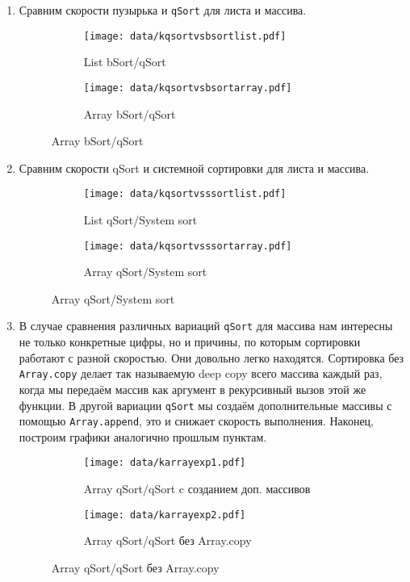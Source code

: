 \begin{enumerate}
\begin{figure}[H]
\begin{subfigure}[b]{0.40\textwidth}
	\end{subfigure}
	\end{figure}
  \item Сравним скорости пузырька и \verb|qSort| для листа и массива.
  	\begin{figure}[H]
	\centering
	\begin{subfigure}[b]{0.40\textwidth}
       \centering
	   \texttt{[image: data/kqsortvsbsortlist.pdf]}
	   \caption{List bSort/qSort}
	\end{subfigure}
	\begin{subfigure}[b]{0.40\textwidth}
       \centering
	   \texttt{[image: data/kqsortvsbsortarray.pdf]}
	   \caption{Array bSort/qSort}
	\end{subfigure}
	\end{figure}
  \item Сравним скорости qSort и системной сортировки для листа и массива.
  	\begin{figure}[H]
	\centering
	\begin{subfigure}[b]{0.40\textwidth}
       \centering
	   \texttt{[image: data/kqsortvsssortlist.pdf]}
	   \caption{List qSort/System sort}
	\end{subfigure}
	\begin{subfigure}[b]{0.40\textwidth}
       \centering
	   \texttt{[image: data/kqsortvsssortarray.pdf]}
	   \caption{Array qSort/System sort}
	\end{subfigure}
	\end{figure}
  \item В случае сравнения различных вариаций \verb|qSort| для массива нам интересны не только конкретные цифры, но и причины, по которым сортировки работают с разной скоростью. Они довольно легко находятся. Сортировка без \verb|Array.copy| делает так называемую deep copy всего массива каждый раз, когда мы передаём массив как аргумент в рекурсивный вызов этой же функции. В другой вариации \verb|qSort| мы создаём дополнительные массивы с помощью \verb|Array.append|, это и снижает скорость выполнения. Наконец, построим графики аналогично прошлым пунктам.
  	\begin{figure}[H]
	\centering
	\begin{subfigure}[b]{0.40\textwidth}
       \centering
	   \texttt{[image: data/karrayexp1.pdf]}
	   \caption{Array qSort/qSort c созданием доп. массивов}
	\end{subfigure}
	\begin{subfigure}[b]{0.40\textwidth}
       \centering
	   \texttt{[image: data/karrayexp2.pdf]}
	   \caption{Array qSort/qSort без Array.copy}
	\end{subfigure}
	\end{figure}
\end{enumerate}

